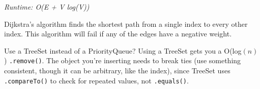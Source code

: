 
\textit{Runtime: O(E + V log(V))}

Dijkstra’s algorithm finds the shortest path from a single index to every other index. This algorithm will fail if any of the edges have a negative weight.

Use a TreeSet instead of a PriorityQueue? Using a TreeSet gets you a O(log$(n)$) \lstinline{.remove()}. The object you're inserting needs to break ties (use something consistent, though it can be arbitrary, like the index), since TreeSet uses \lstinline{.compareTo()} to check for repeated values, not \lstinline{.equals()}.



\newpage